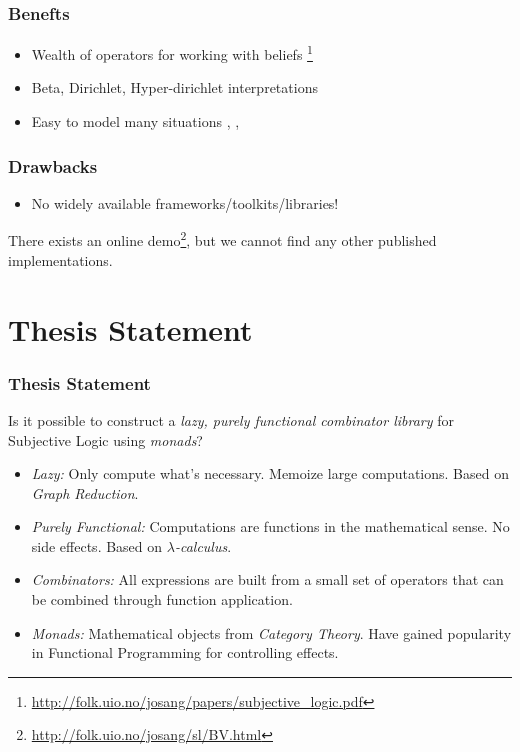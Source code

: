 \documentclass{beamer}
\begin{document}

\begin{frame}
\frametitle{Benefts}

\begin{itemize}
  \item Wealth of operators for working with beliefs
     \footnote{\url{http://folk.uio.no/josang/papers/subjective_logic.pdf}}
  \item Beta, Dirichlet, Hyper-dirichlet interpretations
  \item Easy to model many situations
    \cite{josang2008conditional}, \cite{josang2006trust}, \cite{kent2010application}
\end{itemize}

\end{frame}


\begin{frame}
\frametitle{Drawbacks}

\begin{itemize}
  \item No widely available frameworks/toolkits/libraries!
\end{itemize}

There exists an online demo\footnote{\url{http://folk.uio.no/josang/sl/BV.html}},
but we cannot find any other published implementations.

\end{frame}

%
%

\section{Thesis Statement}

\begin{frame}
\frametitle{Thesis Statement}

Is it possible to construct a \emph{lazy, purely functional combinator library} for Subjective
Logic using \emph{monads}?

\begin{itemize}
  \item \emph{Lazy:} Only compute what's necessary. Memoize large computations. Based
    on \emph{Graph Reduction}.
  \item \emph{Purely Functional:} Computations are functions in the mathematical sense.
    No side effects. Based on \emph{$\lambda$-calculus}.
  \item \emph{Combinators:} All expressions are built from a small set of operators that
    can be combined through function application.
  \item \emph{Monads:} Mathematical objects from \emph{Category Theory}. Have gained
    popularity in Functional Programming for controlling effects.
\end{itemize}

\end{frame}
\end{document}
